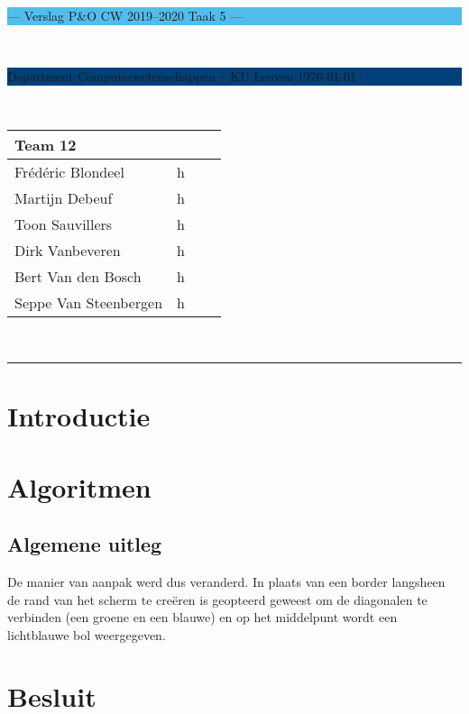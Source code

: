 \documentclass[a4paper,11pt]{article}
\begin{document}
\noindent
\colorbox[HTML]{52BDEC}{\bfseries\parbox{\textwidth}{\centering\large
  --- Verslag P\&O CW 2019--2020 Taak 5 ---
}}
\\[-1mm]
\colorbox[HTML]{00407A}{\bfseries\color{white}\parbox{\textwidth}{
  Department Computerwetenschappen -- KU Leuven
  \hfill
  \today
}}
\\

\smallskip

\noindent

\begin{tabular}{*4l}
\toprule
\multicolumn{2}{l}{\large\textbf{Team 12}} \\
\midrule
Frédéric Blondeel & h \\
Martijn Debeuf & h \\
Toon Sauvillers & h \\ %
Dirk Vanbeveren & h \\
Bert Van den Bosch & h \\
Seppe Van Steenbergen & h \\


\bottomrule
\hline
\end{tabular}\\

\noindent
{\color[HTML]{52BDEC} \rule{\linewidth}{1mm} }

\section{Introductie}\label{sec:introductie}


\section{Algoritmen}
\subsection{Algemene uitleg}
De manier van aanpak werd dus veranderd. In plaats van een border langsheen de rand van het scherm te creëren is geopteerd geweest om de diagonalen te verbinden (een groene en een blauwe) en op het middelpunt wordt een lichtblauwe bol weergegeven.



\section{Besluit}\label{sec:besluit}

\newpage



\end{document}
